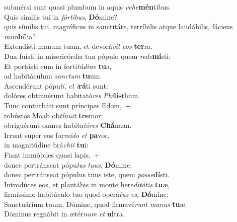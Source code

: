\oddverse submérsi sunt quasi plumbum in aquis \textit{ve}\textit{he}\textbf{mén}tibus.\\
\evenverse Quis símilis tui in \textit{fór}\textit{ti}\textit{bus}, \textbf{Dó}mine?~\*\\
\evenverse quis símilis tui, magníficus in sanctitáte, terríbilis atque laudábilis, fáciens \textit{mi}\textit{ra}\textbf{bí}lia?\\
\oddverse Extendísti manum tuam, et devorá\textit{vit} \textit{e}\textit{os} \textbf{ter}ra.~\*\\
\oddverse Dux fuísti in misericórdia tua pópulo quem \textit{re}\textit{de}\textbf{mí}sti:\\
\evenverse Et portásti eum in forti\textit{tú}\textit{di}\textit{ne} \textbf{tu}a,~\*\\
\evenverse ad habitáculum \textit{san}\textit{ctum} \textbf{tu}um.\\
\oddverse Ascendérunt pópu\textit{li}, \textit{et} \textit{i}\textbf{rá}ti sunt:~\*\\
\oddverse dolóres obtinuérunt habitató\textit{res} \textit{Phi}\textbf{lís}thiim.\\
\evenverse Tunc conturbáti sunt príncipes Edom,~+\\
\evenverse  robústos Moab ob\textit{tí}\textit{nu}\textit{it} \textbf{tre}mor:~\*\\
\evenverse obriguérunt omnes habita\textit{tó}\textit{res} \textbf{Chá}naan.\\
\oddverse Irruat super eos for\textit{mí}\textit{do} \textit{et} \textbf{pa}vor,~\*\\
\oddverse in magnitúdine brá\textit{chi}\textit{i} \textbf{tu}i:\\
\evenverse Fiant immóbiles quasi lapis,~+\\
\evenverse  donec pertránseat pópu\textit{lus} \textit{tu}\textit{us}, \textbf{Dó}mine,~\*\\
\evenverse donec pertránseat pópulus tuus iste, quem \textit{pos}\textit{se}\textbf{dí}sti.\\
\oddverse Introdúces eos, et plantábis in monte here\textit{di}\textit{tá}\textit{tis} \textbf{tu}æ,~\*\\
\oddverse firmíssimo habitáculo tuo quod operá\textit{tus} \textit{es}, \textbf{Dó}mine:\\
\evenverse Sanctuárium tuum, Dómine, quod firmavé\textit{runt} \textit{ma}\textit{nus} \textbf{tu}æ.~\*\\
\evenverse Dóminus regnábit in ætér\textit{num} \textit{et} \textbf{ul}tra.\\
